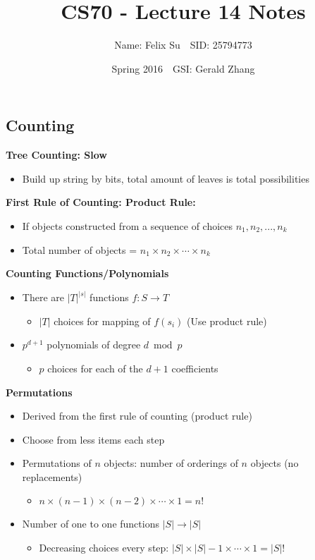 \documentclass{article}\usepackage{amsmath,amssymb,amsthm,tikz,tkz-graph,color,chngpage,soul,hyperref,csquotes,graphicx,floatrow, listings}\newcommand*{\QEDB}{\hfill\ensuremath{\square}}\newtheorem*{prop}{Proposition}\renewcommand{\theenumi}{\alph{enumi}}\usepackage[shortlabels]{enumitem}\usepackage[nobreak=true]{mdframed}\usetikzlibrary{matrix,calc}\MakeOuterQuote{"}\usepackage[margin=0.75in]{geometry} \newtheorem{theorem}{Theorem}\newcommand{\Z}{\mathbb Z}\newcommand{\R}{\mathbb R}\newcommand{\Q}{\mathbb Q}\newcommand{\N}{\mathbb N}
\title{CS70 - Lecture 14 Notes}
\author{Name: Felix Su$\quad$SID: 25794773}
\date{Spring 2016$\quad$GSI: Gerald Zhang}
\begin{document}
\maketitle

\subsection*{Counting}
\textbf{Tree Counting: Slow}
\begin{itemize}
    \item Build up string by bits, total amount of leaves is total possibilities
\end{itemize}
\begin{mdframed}
\textbf{First Rule of Counting: Product Rule:}
\begin{itemize}
    \item If objects constructed from a sequence of choices $n_1, n_2, ..., n_k$
    \item Total number of objects = $n_1 \times n_2 \times \cdots \times n_k$
\end{itemize}
\end{mdframed}
\textbf{Counting Functions/Polynomials}
\begin{itemize}
    \item There are $|T|^{|s|}$ functions $f : S \rightarrow T$
    \begin{itemize}
        \item $|T|$ choices for mapping of $f(s_i)$ (Use product rule)
    \end{itemize}
    \item $p^{d+1}$ polynomials of degree $d \bmod{p}$
    \begin{itemize}
        \item $p$ choices for each of the $d+1$ coefficients
    \end{itemize}
\end{itemize}
\textbf{Permutations}
\begin{itemize}
    \item Derived from the first rule of counting (product rule)
    \item Choose from less items each step
    \item Permutations of $n$ objects: number of orderings of $n$ objects (no replacements)
    \begin{itemize}
        \item $n \times (n-1) \times (n-2) \times\cdots \times 1 = n!$
    \end{itemize}
    \item Number of one to one functions $|S| \rightarrow |S|$ 
    \begin{itemize}
        \item Decreasing choices every step: $|S| \times |S|-1 \times \cdots \times 1 = |S|!$
    \end{itemize}
\end{itemize}
\end{document}
